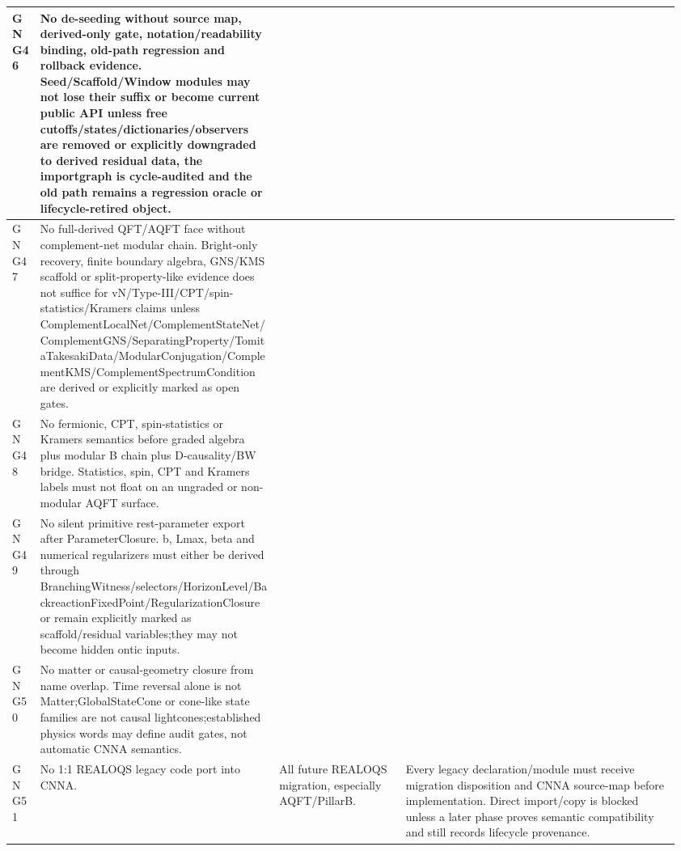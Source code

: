 \begin{longtable}{L{0.045\linewidth} L{0.345\linewidth} L{0.185\linewidth} L{0.39\linewidth}}
\hline
\addlinespace[0.24em]
GNG46 & No de-seeding without source map, derived-only gate, notation/\allowbreak{}readability binding, old-path regression and rollback evidence. Seed/\allowbreak{}Scaffold/\allowbreak{}Window modules may not lose their suffix or become current public API unless free cutoffs/\allowbreak{}states/\allowbreak{}dictionaries/\allowbreak{}observers are removed or explicitly downgraded to derived residual data, the importgraph is cycle-audited and the old path remains a regression oracle or lifecycle-retired object. &  & \\
\hline
\addlinespace[0.24em]
GNG47 & No full-derived QFT/\allowbreak{}AQFT face without complement-net modular chain. Bright-only recovery, finite boundary algebra, GNS/\allowbreak{}KMS scaffold or split-property-like evidence does not suffice for vN/\allowbreak{}Type-III/\allowbreak{}CPT/\allowbreak{}spin-statistics/\allowbreak{}Kramers claims unless ComplementLocalNet/\allowbreak{}ComplementStateNet/\allowbreak{}ComplementGNS/\allowbreak{}SeparatingProperty/\allowbreak{}TomitaTakesakiData/\allowbreak{}ModularConjugation/\allowbreak{}ComplementKMS/\allowbreak{}ComplementSpectrumCondition are derived or explicitly marked as open gates. &  & \\
\hline
\addlinespace[0.24em]
GNG48 & No fermionic, CPT, spin-statistics or Kramers semantics before graded algebra plus modular B chain plus D-causality/\allowbreak{}BW bridge. Statistics, spin, CPT and Kramers labels must not float on an ungraded or non-modular AQFT surface. &  & \\
\hline
\addlinespace[0.24em]
GNG49 & No silent primitive rest-parameter export after ParameterClosure. b, Lmax, beta and numerical regularizers must either be derived through BranchingWitness/\allowbreak{}selectors/\allowbreak{}HorizonLevel/\allowbreak{}BackreactionFixedPoint/\allowbreak{}RegularizationClosure or remain explicitly marked as scaffold/\allowbreak{}residual variables;\newline they may not become hidden ontic inputs. &  & \\
\hline
\addlinespace[0.24em]
GNG50 & No matter or causal-geometry closure from name overlap. Time reversal alone is not Matter;\newline GlobalStateCone or cone-like state families are not causal lightcones;\newline established physics words may define audit gates, not automatic CNNA semantics. &  & \\
\hline
\addlinespace[0.24em]
GNG51 & No 1:1 REALOQS legacy code port into CNNA. & All future REALOQS migration, especially AQFT/\allowbreak{}PillarB. & Every legacy declaration/\allowbreak{}module must receive migration disposition and CNNA source-map before implementation. Direct import/\allowbreak{}copy is blocked unless a later phase proves semantic compatibility and still records lifecycle provenance.\\

\end{longtable}

